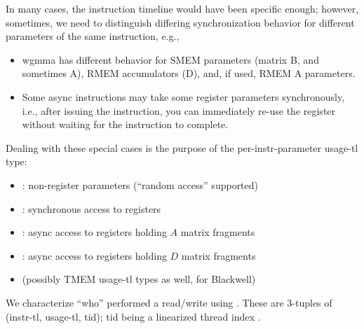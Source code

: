 \filbreak
{}

In many cases, the instruction timeline would have been specific enough; however, sometimes, we need to distinguish differing synchronization behavior for different parameters of the same instruction, e.g.,
\begin{itemize}
  \item wgmma has different behavior for SMEM parameters (matrix B, and sometimes A), RMEM accumulators (D), and, if used, RMEM A parameters.
  \filbreak
  \item Some async instructions may take some register parameters synchronously, i.e., after issuing the instruction, you can immediately re-use the register without waiting for the instruction to complete.
\end{itemize}
\filbreak
Dealing with these special cases is the purpose of the per-instr-parameter usage-tl type:
\begin{itemize}
  \item {}: non-register parameters (``random access'' supported)
  \filbreak
  \item {}: synchronous access to registers
  \filbreak
  \item {}: async access to registers holding $A$ matrix fragments
  \filbreak
  \item {}: async access to registers holding $D$ matrix fragments
  \filbreak
  \item (possibly TMEM usage-tl types as well, for Blackwell)
\end{itemize}

\filbreak
{}

We characterize ``who'' performed a read/write  using .
These are 3-tuples of (instr-tl, usage-tl, tid); tid being a linearized thread index .

\filbreak
{}

